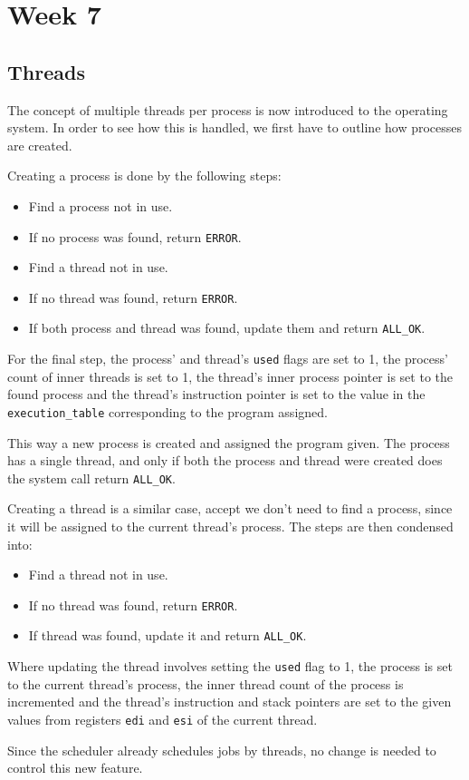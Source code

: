 \section{Week 7}

\subsection{Threads}

The concept of multiple threads per process is now introduced to the operating system. In order to see how this is handled, we first have to outline how processes are created.

Creating a process is done by the following steps:
\begin{itemize}
    \item Find a process not in use.
    \item If no process was found, return \texttt{ERROR}.
    \item Find a thread not in use.
    \item If no thread was found, return \texttt{ERROR}.
    \item If both process and thread was found, update them and return \texttt{ALL\_OK}.
\end{itemize}

For the final step, the process' and thread's \texttt{used} flags are set to 1, the process' count of inner threads is set to 1, the thread's inner process pointer is set to the found process and the thread's instruction pointer is set to the value in the \texttt{execution\_table} corresponding to the program assigned. 

This way a new process is created and assigned the program given. The process has a single thread, and only if both the process and thread were created does the system call return \texttt{ALL\_OK}.

Creating a thread is a similar case, accept we don't need to find a process, since it will be assigned to the current thread's process. The steps are then condensed into:

\begin{itemize}
    \item Find a thread not in use.
    \item If no thread was found, return \texttt{ERROR}.
    \item If thread was found, update it and return \texttt{ALL\_OK}.
\end{itemize}

Where updating the thread involves setting the \texttt{used} flag to 1, the process is set to the current thread's process, the inner thread count of the process is incremented and the thread's instruction and stack pointers are set to the given values from registers \texttt{edi} and \texttt{esi} of the current thread.

Since the scheduler already schedules jobs by threads, no change is needed to control this new feature.